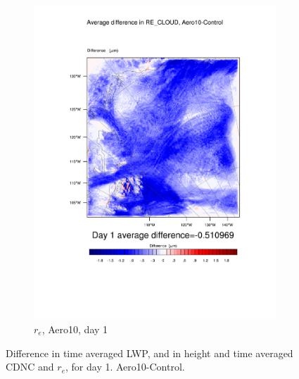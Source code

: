 \begin{figure}[hb]
	\begin{subfigure}{0.48\textwidth}
		\centering
		\includegraphics[width=\textwidth]{results/aero10/diff_Aero10_RE_CLOUD_Day1.pdf}
		\caption{$r_e$, Aero10, day 1}
		\label{subfig:recloud_r3Day1}
	\end{subfigure}
\caption{Difference in time averaged LWP, and in height and time averaged CDNC and $r_e$, for day 1. Aero10-Control.}
\label{fig:lwpcdncre_r3Day1}
\end{figure}

